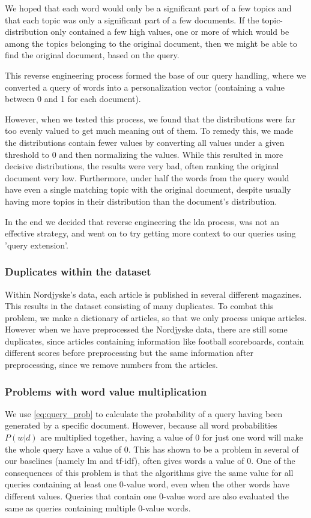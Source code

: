 We hoped that each word would only be a significant part of a few topics and that each topic was only a significant part of a few documents.
If the topic-distribution only contained a few high values, one or more of which would be among the topics belonging to the original document, then we might be able to find the original document, based on the query.

This reverse engineering process formed the base of our query handling, where we converted a query of words into a personalization vector (containing a value between 0 and 1 for each document).

However, when we tested this process, we found that the distributions were far too evenly valued to get much meaning out of them.
To remedy this, we made the distributions contain fewer values by converting all values under a given threshold to 0 and then normalizing the values.
While this resulted in more decisive distributions, the results were very bad, often ranking the original document very low.
Furthermore, under half the words from the query would have even a single matching topic with the original document, despite usually having more topics in their distribution than the document's distribution.
 
In the end we decided that reverse engineering the \gls{lda} process, was not an effective strategy, and went on to try getting more context to our queries using 'query extension'.


\subsubsection{Duplicates within the dataset}
Within Nordjyske's data, each article is published in several different magazines. 
This results in the dataset consisting of many duplicates. 
To combat this problem, we make a dictionary of articles, so that we only process unique articles.
However when we have preprocessed the Nordjyske data, there are still some duplicates, since articles containing information like football scoreboards, contain different scores before preprocessing but the same information after preprocessing, since we remove numbers from the articles.


\subsubsection{Problems with word value multiplication}
We use \autoref{eq:query_prob} to calculate the probability of a query having been generated by a specific document. 
However, because all word probabilities $P(w|d)$ are multiplied together, having a value of 0 for just one word will make the whole query have a value of 0.
This has shown to be a problem in several of our baselines (namely \gls{lm} and \gls{tf-idf}), often gives words a value of 0.
One of the consequences of this problem is that the algorithms give the same value for all queries containing at least one 0-value word, even when the other words have different values. 
Queries that contain one 0-value word are also evaluated the same as queries containing multiple 0-value words.

